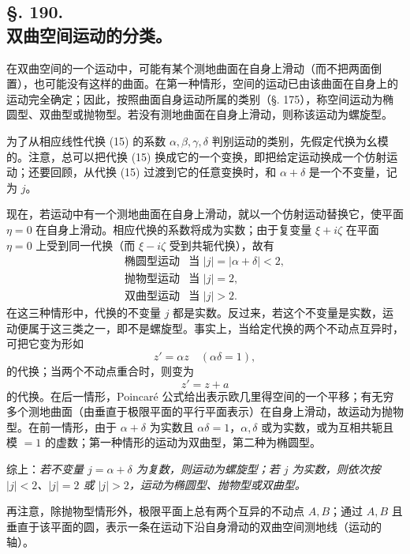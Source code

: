 \subsection*{§. 190.\\ 双曲空间运动的分类。}

在双曲空间的一个运动中，可能有某个测地曲面在自身上滑动（而不把两面倒置），也可能没有这样的曲面。在第一种情形，空间的运动已由该曲面在自身上的运动完全确定；因此，按照曲面自身运动所属的类别（§. 175），称空间运动为椭圆型、双曲型或抛物型。若没有测地曲面在自身上滑动，则称该运动为螺旋型。

为了从相应线性代换 (15) 的系数 $\alpha,\beta,\gamma,\delta$ 判别运动的类别，先假定代换为幺模的。注意，总可以把代换 (15) 换成它的一个变换，即把给定运动换成一个仿射运动；还要回顾，从代换 (15) 过渡到它的任意变换时，和 $\alpha+\delta$ 是一个不变量，记为 $j$。

现在，若运动中有一个测地曲面在自身上滑动，就以一个仿射运动替换它，使平面 $\eta=0$ 在自身上滑动。相应代换的系数将成为实数；由于复变量 $\xi+i\zeta$ 在平面 $\eta=0$ 上受到同一代换（而 $\xi-i\zeta$ 受到共轭代换），故有
\[
\begin{array}{ll}
\text{椭圆型运动} & \text{当 } |j|=|\alpha+\delta|<2,\\
\text{抛物型运动} & \text{当 } |j|=2,\\
\text{双曲型运动} & \text{当 } |j|>2.
\end{array}
\]
在这三种情形中，代换的不变量 $j$ 都是实数。反过来，若这个不变量是实数，运动便属于这三类之一，即不是螺旋型。事实上，当给定代换的两个不动点互异时，可把它变为形如
\[
 z'=\alpha z \quad(\alpha\delta=1),
\]
的代换；当两个不动点重合时，则变为
\[
 z'=z+a
\]
的代换。在后一情形，Poincaré 公式给出表示欧几里得空间的一个平移；有无穷多个测地曲面（由垂直于极限平面的平行平面表示）在自身上滑动，故运动为抛物型。在前一情形，由于 $\alpha+\delta$ 为实数且 $\alpha\delta=1$，$\alpha,\delta$ 或为实数，或为互相共轭且模 $=1$ 的虚数；第一种情形的运动为双曲型，第二种为椭圆型。

综上：\emph{若不变量 $j=\alpha+\delta$ 为复数，则运动为螺旋型；若 $j$ 为实数，则依次按 $|j|<2$、$|j|=2$ 或 $|j|>2$，运动为椭圆型、抛物型或双曲型。}

再注意，除抛物型情形外，极限平面上总有两个互异的不动点 $A,B$；通过 $A,B$ 且垂直于该平面的圆，表示一条在运动下沿自身滑动的双曲空间测地线（运动的轴）。

